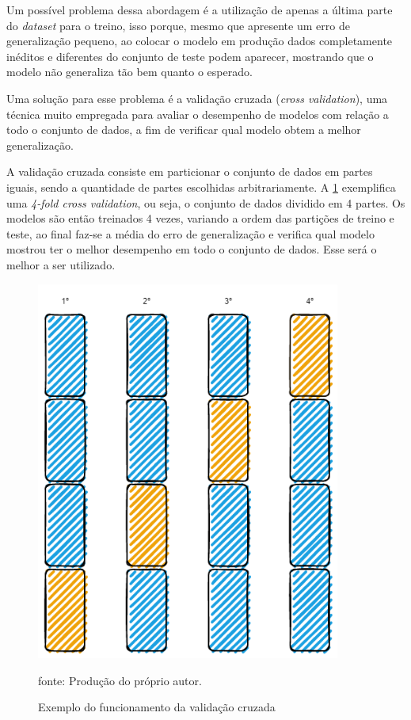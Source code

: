 \documentclass[
  12pt,		%
  a4paper,	%
  openright,%
  oneside,	%
  chapter=TITLE,		%
  section=TITLE,		%
  english,	%
  french,	%
  spanish,	%
  brazil	%
]{abntex2}
\begin{document}
    Um possível problema dessa abordagem é a utilização de apenas a última parte do \textit{dataset} para o treino, isso porque,
    mesmo que apresente um erro de generalização pequeno, ao colocar o modelo em produção dados completamente inéditos e diferentes
    do conjunto de teste podem aparecer, mostrando que o modelo não generaliza tão bem quanto o esperado.

    Uma solução para esse problema é a validação cruzada (\textit{cross validation}), uma técnica muito empregada para avaliar o desempenho de
    modelos com relação a todo o conjunto de dados, a fim de verificar qual modelo obtem a melhor generalização.

    A validação cruzada consiste em particionar o conjunto de dados em partes iguais, sendo a quantidade de partes escolhidas
    arbitrariamente. A \ref*{exemplo_cross_val} exemplifica uma \textit{4-fold cross validation}, ou seja, o conjunto de dados
    dividido em 4 partes. Os modelos são então treinados 4 vezes, variando a ordem das partições de treino e teste, ao final
    faz-se a média do erro de generalização e verifica qual modelo mostrou ter o melhor desempenho em todo o conjunto de dados.
    Esse será o melhor a ser utilizado.

    \begin{figure}[h]
        \centering
        \caption{Exemplo do funcionamento da validação cruzada}
        \includegraphics[width=10cm]{../reports/figures/cross_validation_example.png}
        \label{exemplo_cross_val}
        \par
        {\small fonte: Produção do próprio autor.}
    \end{figure}
\end{document}
